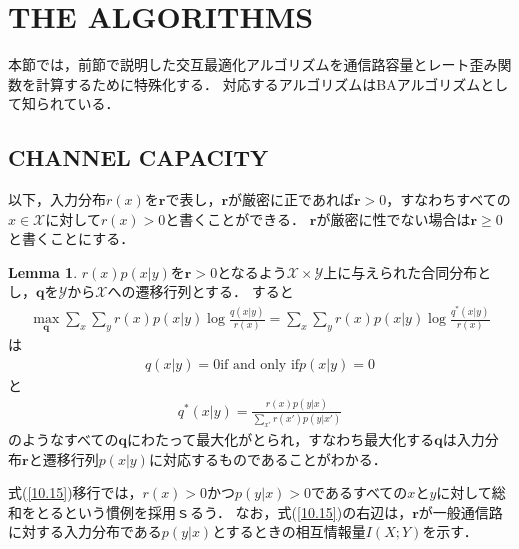 \documentclass{ltjsarticle}
\theoremstyle{definition}
\newtheorem{lem}[dfn]{Lemma}
\begin{document}
\section{THE ALGORITHMS}
本節では，前節で説明した交互最適化アルゴリズムを通信路容量とレート歪み関数を計算するために特殊化する．
対応するアルゴリズムはBAアルゴリズムとして知られている．

\subsection{CHANNEL CAPACITY}
以下，入力分布$r(x)$を$\mathbf{r}$で表し，$\mathbf{r}$が厳密に正であれば$\mathbf{r} > 0$，すなわちすべての$x \in \mathcal{X}$に対して$r(x) > 0$と書くことができる．
$\mathbf{r}$が厳密に性でない場合は$\mathbf{r} \geq 0$と書くことにする．

\begin{lem}
  $r(x)p(x|y)$を$\mathbf{r} > 0$となるよう$\mathcal{X} \times \mathcal{Y}$上に与えられた合同分布とし，$\mathbf{q}$を$\mathcal{Y}$から$\mathcal{X}$への遷移行列とする．
  すると
  \begin{eqnarray}
    \label{10.15}
    \max_{\mathbf{q}} \sum_{x} \sum_{y} r(x) p(x|y) \log \frac{q(x|y)}{r(x)} = \sum_{x} \sum_{y} r(x) p(x|y) \log \frac{q^*(x|y)}{r(x)}
  \end{eqnarray}
  は
  \begin{eqnarray}
    \label{10.16}
    q(x|y) = 0 \mbox{if and only if} p(x|y) = 0
  \end{eqnarray}
  と
  \begin{eqnarray}
    \label{10.17}
    q^*(x|y) = \frac{r(x)p(y|x)}{\sum_{x'} r(x')p(y|x')}
  \end{eqnarray}
  のようなすべての$\mathbf{q}$にわたって最大化がとられ，すなわち最大化する$\mathbf{q}$は入力分布$\mathbf{r}$と遷移行列$p(x|y)$に対応するものであることがわかる．
\end{lem}

式(\ref{10.15})移行では，$r(x) > 0$かつ$p(y|x) > 0$であるすべての$x$と$y$に対して総和をとるという慣例を採用ｓるう．
なお，式(\ref{10.15})の右辺は，$\mathbf{r}$が一般通信路に対する入力分布である$p(y|x)$とするときの相互情報量$I(X;Y)$を示す．
\end{document}
